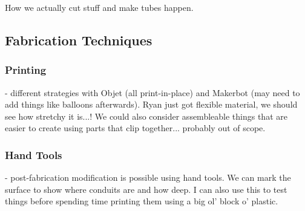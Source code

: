How we actually cut stuff and make tubes happen.

\subsection{Fabrication Techniques}

\subsubsection{Printing} - different strategies with Objet (all print-in-place) and Makerbot (may need to add things like balloons afterwards).  Ryan just got flexible material, we should see how stretchy it is...!  We could also consider assembleable things that are easier to create using parts that clip together... probably out of scope.

\subsubsection{Hand Tools} - post-fabrication modification is possible using hand tools.  We can mark the surface to show where conduits are and how deep.  I can also use this to test things before spending time printing them using a big ol' block o' plastic.